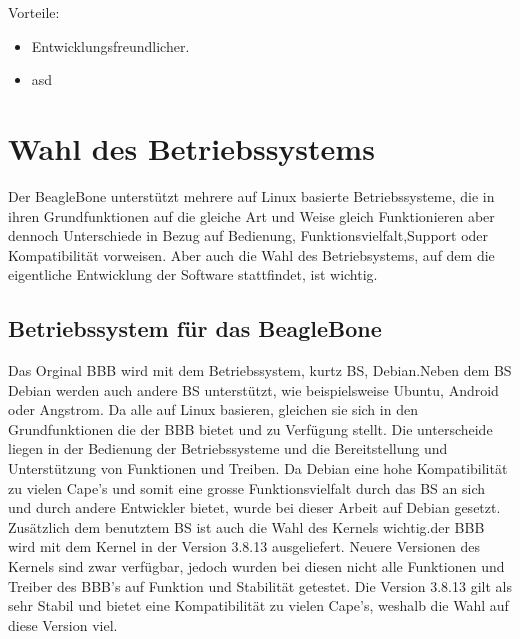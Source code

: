 Vorteile:
\begin{itemize}
\item Entwicklungsfreundlicher. 
\item asd
\end{itemize}

\section{Wahl des Betriebssystems}
Der BeagleBone unterstützt mehrere auf Linux basierte Betriebssysteme, die in ihren Grundfunktionen auf die gleiche Art und Weise gleich Funktionieren aber dennoch Unterschiede in Bezug auf Bedienung, Funktionsvielfalt,Support oder Kompatibilität vorweisen.
Aber auch die Wahl des Betriebsystems, auf dem die eigentliche Entwicklung der Software stattfindet, ist wichtig. 

\subsection{Betriebssystem für das BeagleBone}
Das Orginal BBB wird mit dem Betriebssystem, kurtz BS, Debian.Neben dem BS Debian werden auch andere BS unterstützt, wie beispielsweise Ubuntu, Android oder Angstrom. Da alle auf Linux basieren, gleichen sie sich in den Grundfunktionen die der BBB bietet und zu Verfügung stellt. Die unterscheide liegen in der Bedienung der Betriebssysteme und die Bereitstellung und Unterstützung von Funktionen und Treiben. Da Debian eine hohe Kompatibilität zu vielen Cape's und somit eine grosse Funktionsvielfalt durch das BS an sich und durch andere Entwickler bietet, wurde bei dieser Arbeit auf Debian gesetzt. 
Zusätzlich dem benutztem BS ist auch die Wahl des Kernels wichtig.der BBB wird mit dem Kernel in der Version 3.8.13 ausgeliefert. Neuere Versionen des Kernels sind zwar verfügbar, jedoch wurden bei diesen nicht alle Funktionen und Treiber des BBB's auf Funktion und Stabilität getestet. Die Version 3.8.13 gilt als sehr Stabil und bietet eine Kompatibilität zu vielen Cape's, weshalb die Wahl auf diese Version viel.

